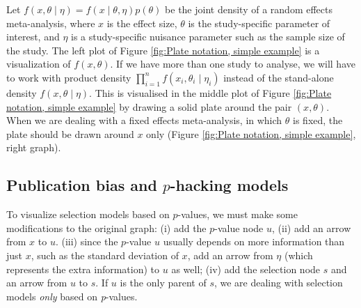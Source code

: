 \documentclass[preprint, authoryear]{elsarticle}
\theoremstyle{plain}
\theoremstyle{definition}
\begin{document}
Let $f\left(x,\theta\mid\eta\right)=f\left(x\mid\theta,\eta\right)p\left(\theta\right)$
be the joint density of a random effects meta-analysis, where $x$ is the effect size, $\theta$ is the study-specific parameter of interest, and $\eta$ is a study-specific nuisance parameter such as the sample size of the study. The left plot of Figure \ref{fig:Plate notation, simple example} is a visualization of $f\left(x,\theta\right)$. If we have more than one study to analyse, we will have to work with product density $\prod_{i=1}^{n}f\left(x_{i},\theta_{i}\mid\eta_{i}\right)$ instead of the stand-alone density $f\left(x,\theta\mid\eta\right)$. This is visualised in the middle plot of Figure \ref{fig:Plate notation, simple example}  by drawing a solid plate around the pair $\left(x,\theta\right)$. When we are dealing with a fixed effects meta-analysis, in which $\theta$ is fixed, the plate should be drawn around $x$ only (Figure \ref{fig:Plate notation, simple example}, right graph). 


\subsection{Publication bias and $p$-hacking models\label{subsec:Selection sets, meta analysis}}

To visualize selection models based on $p$-values, we must make some modifications to the original graph: (i) add the $p$-value node $u$, (ii) add an arrow from $x$ to $u$. (iii) since the $p$-value $u$ usually depends on more information than just $x$, such as the standard deviation of $x$, add an arrow from $\eta$ (which represents the extra information) to $u$ as well; (iv) add the selection node $s$ and an arrow from $u$ to $s$. If $u$ is the only parent of $s$, we are dealing with selection models \emph{only} based on
\emph{p}-values. 
\end{document}
